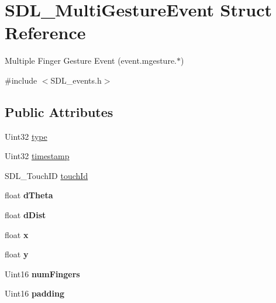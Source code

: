 \hypertarget{struct_s_d_l___multi_gesture_event}{}\section{S\+D\+L\+\_\+\+Multi\+Gesture\+Event Struct Reference}
\label{struct_s_d_l___multi_gesture_event}


Multiple Finger Gesture Event (event.\+mgesture.$\ast$)  




{\ttfamily \#include $<$S\+D\+L\+\_\+events.\+h$>$}

\subsection*{Public Attributes}
\begin{DoxyCompactItemize}
\item 
Uint32 \mbox{\hyperlink{struct_s_d_l___multi_gesture_event_ab0c7adc9a3f71cc3532bfe0ff8cc6120}{type}}
\item 
Uint32 \mbox{\hyperlink{struct_s_d_l___multi_gesture_event_a7e99a98debf3ce11f6d2a2fbb3637175}{timestamp}}
\item 
S\+D\+L\+\_\+\+Touch\+ID \mbox{\hyperlink{struct_s_d_l___multi_gesture_event_aa15d1201559a3c9277082af71a972dc1}{touch\+Id}}
\item 
\mbox{\label{struct_s_d_l___multi_gesture_event_a4f4a920dcf5205baa24a140df56f3153}} 
float {\bfseries d\+Theta}
\item 
\mbox{\label{struct_s_d_l___multi_gesture_event_a351c29785c5ce3f68c4591a427265f14}} 
float {\bfseries d\+Dist}
\item 
\mbox{\label{struct_s_d_l___multi_gesture_event_a1708fc3c788fd12cc0beb5dc05cf31ca}} 
float {\bfseries x}
\item 
\mbox{\label{struct_s_d_l___multi_gesture_event_a264602b9c5cc027eb6a283adda428454}} 
float {\bfseries y}
\item 
\mbox{\label{struct_s_d_l___multi_gesture_event_a6b06cf80372ce3cad40110fdb6ef0353}} 
Uint16 {\bfseries num\+Fingers}
\item 
\mbox{\label{struct_s_d_l___multi_gesture_event_a4804ec87789e697aba138c4888bb304b}} 
Uint16 {\bfseries padding}
\end{DoxyCompactItemize}


